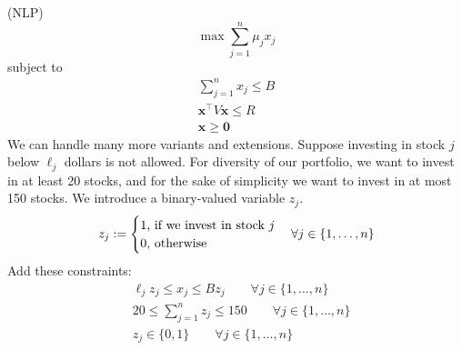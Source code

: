 \begin{exbox}
\begin{example}
        (NLP)
        \[\max \sum_{j = 1}^{n}\mu_j x_j\]
        subject to
        \begin{align*}
            \sum_{j = 1}^{n}x_j\leqslant B  \\
            \bm{x}^\top  V\bm{x}\leqslant R \\
            \bm{x}\geqslant  \bm{0}
        \end{align*}
        We can handle many more variants and extensions. Suppose investing in stock
        $j$ below $\ell_j$ dollars is not allowed. For diversity of our portfolio, we
        want to invest in at least 20 stocks, and for the sake of simplicity we want
        to invest in at most 150 stocks. We introduce a binary-valued variable $z_j$.
        \[z_j:=
            \begin{cases}
                1 \text{, if we invest in stock $j$} \\
                0 \text{, otherwise}
            \end{cases}
            \forall j\in\{1,\dots,n\}\\
        \]
        Add these constraints:
        \begin{align*}
             & \ell_j z_j\leqslant x_j\leqslant B z_j\qquad \forall j\in\{1,\dots,n\}        \\
             & 20\leqslant \sum_{j = 1}^{n}z_j\leqslant 150 \qquad \forall j\in\{1,\dots,n\} \\
             & z_j\in\{0,1\} \qquad \forall j\in\{1,\dots,n\}                                \\
        \end{align*}
    \end{example}
\end{exbox}
